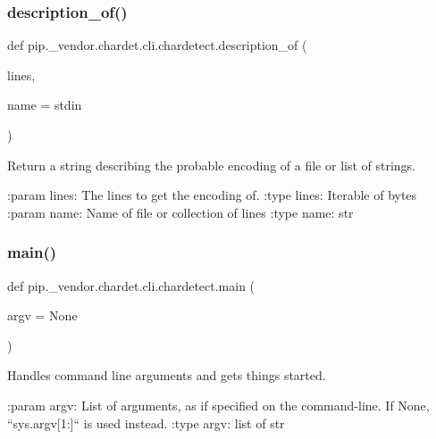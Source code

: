 \subsubsection{\texorpdfstring{description\+\_\+of()}{description\_of()}}
{\footnotesize\ttfamily def pip.\+\_\+vendor.\+chardet.\+cli.\+chardetect.\+description\+\_\+of (\begin{DoxyParamCaption}\item[{}]{lines,  }\item[{}]{name = {\ttfamily \textquotesingle{}stdin\textquotesingle{}} }\end{DoxyParamCaption})}

\begin{DoxyVerb}Return a string describing the probable encoding of a file or
list of strings.

:param lines: The lines to get the encoding of.
:type lines: Iterable of bytes
:param name: Name of file or collection of lines
:type name: str
\end{DoxyVerb}
 \mbox{\label{namespacepip_1_1__vendor_1_1chardet_1_1cli_1_1chardetect_af87d264701f991d8bc4bd35121273285}} 
\subsubsection{\texorpdfstring{main()}{main()}}
{\footnotesize\ttfamily def pip.\+\_\+vendor.\+chardet.\+cli.\+chardetect.\+main (\begin{DoxyParamCaption}\item[{}]{argv = {\ttfamily None} }\end{DoxyParamCaption})}

\begin{DoxyVerb}Handles command line arguments and gets things started.

:param argv: List of arguments, as if specified on the command-line.
             If None, ``sys.argv[1:]`` is used instead.
:type argv: list of str
\end{DoxyVerb}
 